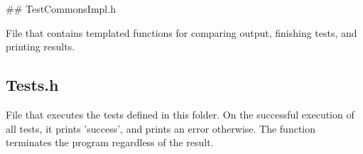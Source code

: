 \#\# Test\+Commons\+Impl.\+h 
\begin{DoxyCode}
File that contains templated functions for comparing output, finishing tests, and printing results.
\end{DoxyCode}


\subsection*{Tests.\+h}


\begin{DoxyCode}
File that executes the tests defined in this folder. On the successful execution of all tests, it prints
       'success', and prints an error otherwise. The function terminates the program regardless of the result.
\end{DoxyCode}
 